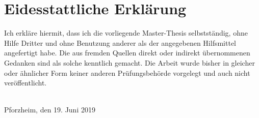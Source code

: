 
\section*{Eidesstattliche Erklärung} \label{declaration}

Ich erkläre hiermit, dass ich die vorliegende Master-Thesis
selbstständig, ohne Hilfe Dritter und ohne Benutzung anderer 
als der angegebenen Hilfsmittel angefertigt habe. 
Die aus fremden Quellen direkt oder indirekt übernommenen Gedanken 
sind als solche kenntlich gemacht. 
Die Arbeit wurde bisher in gleicher oder ähnlicher Form keiner anderen
Prüfungsbehörde vorgelegt und auch nicht veröffentlicht.


\vspace{3cm} \ \\
Pforzheim, den 19. Juni 2019
